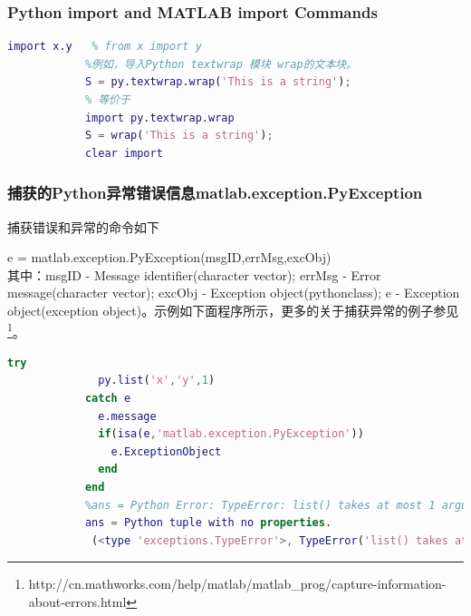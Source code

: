         \subsubsection{Python import and MATLAB import Commands}
            \par
            \begin{lstlisting}[language = Matlab]
            import x.y   % from x import y
            %例如，导入Python textwrap 模块 wrap的文本块。
            S = py.textwrap.wrap('This is a string');
            % 等价于
            import py.textwrap.wrap
            S = wrap('This is a string');
            clear import
            \end{lstlisting}
        \subsubsection{捕获的Python异常错误信息matlab.exception.PyException}
            \par
            捕获错误和异常的命令如下
            \par
            e = matlab.exception.PyException(msgID,errMsg,excObj)\\
            其中：msgID - Message identifier(character vector); errMsg - Error message(character vector); excObj - Exception object(pythonclass); e - Exception object(exception object)。示例如下面程序所示，更多的关于捕获异常的例子参见\footnote{http://cn.mathworks.com/help/matlab/matlab\_prog/capture-information-about-errors.html}。
            \begin{lstlisting}[language = Matlab]
            try
              py.list('x','y',1)
            catch e
              e.message
              if(isa(e,'matlab.exception.PyException'))
                e.ExceptionObject
              end
            end
            %ans = Python Error: TypeError: list() takes at most 1 argument (3 given)
            ans = Python tuple with no properties.
             (<type 'exceptions.TypeError'>, TypeError('list() takes at most 1 argument (3 given)',), None)
            \end{lstlisting}
